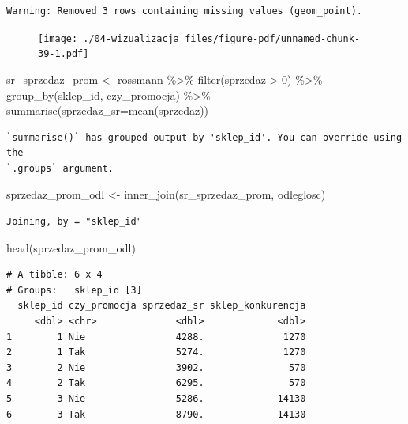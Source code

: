 \documentclass[
  letterpaper,
  DIV=11,
  numbers=noendperiod]{scrreprt}
\newenvironment{Shaded}{\begin{snugshade}}{\end{snugshade}}
\newcommand{\AttributeTok}[1]{\textcolor[rgb]{0.40,0.45,0.13}{#1}}
\newcommand{\DecValTok}[1]{\textcolor[rgb]{0.68,0.00,0.00}{#1}}
\newcommand{\FunctionTok}[1]{\textcolor[rgb]{0.28,0.35,0.67}{#1}}
\newcommand{\NormalTok}[1]{\textcolor[rgb]{0.00,0.23,0.31}{#1}}
\newcommand{\OtherTok}[1]{\textcolor[rgb]{0.00,0.23,0.31}{#1}}
\newcommand{\SpecialCharTok}[1]{\textcolor[rgb]{0.37,0.37,0.37}{#1}}
\begin{document}
\begin{verbatim}
Warning: Removed 3 rows containing missing values (geom_point).
\end{verbatim}

\begin{figure}[H]

{\centering \texttt{[image: ./04-wizualizacja\_files/figure-pdf/unnamed-chunk-39-1.pdf]}

}

\end{figure}

\begin{Shaded}
\begin{Highlighting}[]
\NormalTok{sr\_sprzedaz\_prom }\OtherTok{\textless{}{-}}\NormalTok{ rossmann }\SpecialCharTok{\%\textgreater{}\%}
  \FunctionTok{filter}\NormalTok{(sprzedaz }\SpecialCharTok{\textgreater{}} \DecValTok{0}\NormalTok{) }\SpecialCharTok{\%\textgreater{}\%}
  \FunctionTok{group\_by}\NormalTok{(sklep\_id, czy\_promocja) }\SpecialCharTok{\%\textgreater{}\%}
  \FunctionTok{summarise}\NormalTok{(}\AttributeTok{sprzedaz\_sr=}\FunctionTok{mean}\NormalTok{(sprzedaz))}
\end{Highlighting}
\end{Shaded}

\begin{verbatim}
`summarise()` has grouped output by 'sklep_id'. You can override using the
`.groups` argument.
\end{verbatim}

\begin{Shaded}
\begin{Highlighting}[]
\NormalTok{sprzedaz\_prom\_odl }\OtherTok{\textless{}{-}} \FunctionTok{inner\_join}\NormalTok{(sr\_sprzedaz\_prom, odleglosc)}
\end{Highlighting}
\end{Shaded}

\begin{verbatim}
Joining, by = "sklep_id"
\end{verbatim}

\begin{Shaded}
\begin{Highlighting}[]
\FunctionTok{head}\NormalTok{(sprzedaz\_prom\_odl)}
\end{Highlighting}
\end{Shaded}

\begin{verbatim}
# A tibble: 6 x 4
# Groups:   sklep_id [3]
  sklep_id czy_promocja sprzedaz_sr sklep_konkurencja
     <dbl> <chr>              <dbl>             <dbl>
1        1 Nie                4288.              1270
2        1 Tak                5274.              1270
3        2 Nie                3902.               570
4        2 Tak                6295.               570
5        3 Nie                5286.             14130
6        3 Tak                8790.             14130
\end{verbatim}
\end{document}
